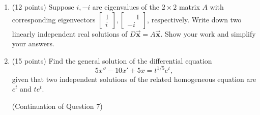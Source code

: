 \documentclass[12pt]{article}
\def\vx{\vec {\mathbf{x}}}
\newcommand{\bu}{\vec{u}}
\newcommand{\bx}{\vec{x}}
\begin{document}
\begin{enumerate}
          
          
          \newpage


          \item (12 points) Suppose $i, -i$ are eigenvalues of the $2 \times 2$
            matrix $A$ with corresponding eigenvectors
            $\begin{bmatrix} 1\\i\end{bmatrix},
            \begin{bmatrix} \phantom{-}1\\-i\end{bmatrix}$,
            respectively.
            Write down two linearly independent real
            solutions of $D\vx = A \vx$.  Show your work and simplify
            your answers.

            \newpage

    \item (15 points) Find the general solution of the differential
      equation
      \[
        5 x'' -10 x' + 5x = t^{1/5} e^t,
      \]
      given that two independent solutions of the related homogeneous
      equation are $e^t$ and $te^t$.

     \newpage
      (Continuation of Question 7)


           
   
      
        


\end{enumerate}
\end{document}
